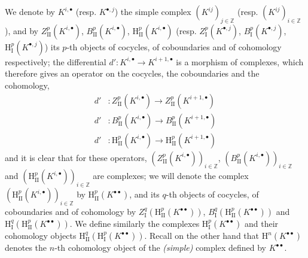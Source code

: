 \begin{env}[11.3.1]
We denote by $K^{i,\bullet}$ (resp. $K^{\bullet,j}$) the simple complex
$(K^{ij})_{j\in\mathbb Z}$ (resp. $(K^{ij})_{i\in\mathbb Z}$), and by
$Z_{\mathrm{II}}^p(K^{i,\bullet})$, $B_{\mathrm{II}}^p(K^{i,\bullet})$,
$\mathrm H_{\mathrm{II}}^p(K^{i,\bullet})$ (resp.
$Z_{\mathrm I}^p(K^{\bullet,j})$, $B_{\mathrm I}^p(K^{\bullet,j})$,
$\mathrm H_{\mathrm I}^p(K^{\bullet,j})$) its $p$-th objects of cocycles,
of coboundaries and of cohomology respectively; the differential
$d':K^{i,\bullet}\to K^{i+1,\bullet}$ is a morphism of complexes, which
therefore gives an operator on the cocycles, the coboundaries and the cohomology,
\[
\begin{aligned}
  d'&:Z_{\mathrm{II}}^p(K^{i,\bullet})
      \longrightarrow Z_{\mathrm{II}}^p(K^{i+1,\bullet})\\
  d'&:B_{\mathrm{II}}^p(K^{i,\bullet})
      \longrightarrow B_{\mathrm{II}}^p(K^{i+1,\bullet})\\
  d'&:\mathrm H_{\mathrm{II}}^p(K^{i,\bullet})
      \longrightarrow \mathrm H_{\mathrm{II}}^p(K^{i+1,\bullet})
\end{aligned}
\]
and it is clear that for these operators,
$(Z_{\mathrm{II}}^p(K^{i,\bullet}))_{i\in\mathbb Z}$,
$(B_{\mathrm{II}}^p(K^{i,\bullet}))_{i\in\mathbb Z}$ and
$(\mathrm H_{\mathrm{II}}^p(K^{i,\bullet}))_{i\in\mathbb Z}$ are
complexes; we will denote the complex
$(\mathrm H_{\mathrm{II}}^p(K^{i,\bullet}))_{i\in\mathbb Z}$ by
$\mathrm H_{\mathrm{II}}^p(K^{\bullet\bullet})$, and its $q$-th objects of
cocycles, of coboundaries and of cohomology by
$Z_{\mathrm I}^q(\mathrm H_{\mathrm{II}}^p(K^{\bullet\bullet}))$,
$B_{\mathrm I}^q(\mathrm H_{\mathrm{II}}^p(K^{\bullet\bullet}))$ and
$\mathrm H_{\mathrm I}^q(\mathrm H_{\mathrm{II}}^p(K^{\bullet\bullet}))$.
We define similarly the complexes
$\mathrm H_{\mathrm I}^p(K^{\bullet\bullet})$ and their cohomology objects
$\mathrm H_{\mathrm{II}}^q(\mathrm H_{\mathrm I}^p(K^{\bullet\bullet}))$.
Recall on the other hand that $\mathrm H^n(K^{\bullet\bullet})$ denotes the
$n$-th cohomology object of the \emph{(simple)} complex defined by
$K^{\bullet\bullet}$.
\end{env}


